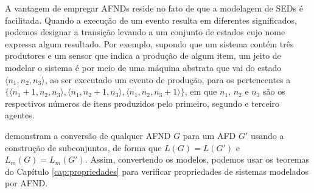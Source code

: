 A vantagem de empregar AFNDs reside no fato de que a modelagem de SEDs é facilitada. Quando a execução de um evento resulta em diferentes significados, podemos designar a transição levando a um conjunto de estados cujo nome expressa algum resultado. Por exemplo, supondo que um sistema contém três produtores e um sensor que indica a produção de algum item, um jeito de modelar o sistema é por meio de uma máquina abstrata que vai do estado $\langle n_1, n_2, n_3 \rangle$, ao ser executado um evento de produção, para os pertencentes a $\{ \langle n_1+1, n_2, n_3 \rangle, \langle n_1, n_2+1, n_3 \rangle, \langle n_1, n_2, n_3+1 \rangle \}$, em que $n_1$, $n_2$ e $n_3$ são os respectivos números de itens produzidos pelo primeiro, segundo e terceiro agentes.

 demonstram a conversão de qualquer AFND $G$ para um AFD $G'$ usando a construção de subconjuntos, de forma que $L(G) = L(G')$ e $L_m(G) = L_m(G')$. Assim, convertendo os modelos, podemos usar os teoremas do Capítulo \ref{cap:propriedades} para verificar propriedades de sistemas modelados por AFND.